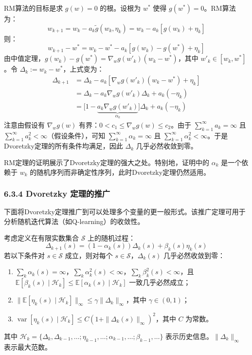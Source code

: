 \documentclass[UTF8]{article}
\begin{document}
\begin{proofbox}
    RM算法的目标是求 $g(w) = 0$ 的根。设根为 $w^*$ 使得 $g(w^*) = 0$。RM算法为：
    \[
    w_{k+1} = w_k - a_k \tilde{g}(w_k, \eta_k) = w_k - a_k[g(w_k) + \eta_k]
    \]
    则：
    \[
    w_{k+1} - w^* = w_k - w^* - a_k[g(w_k) - g(w^*) + \eta_k]
    \]
    由中值定理，$g(w_k) - g(w^*) = \nabla_w g(w'_k)(w_k - w^*)$，其中 $w'_k \in [w_k, w^*]$。令 $\Delta_k := w_k - w^*$，上式变为：
    \[
    \begin{aligned}
    \Delta_{k+1} &= \Delta_k - a_k[\nabla_w g(w'_k)(w_k - w^*) + \eta_k] \\
    &= \Delta_k - a_k \nabla_w g(w'_k)\Delta_k + a_k(-\eta_k) \\
    &= \big[1 - \underbrace{a_k \nabla_w g(w'_k)}_{\alpha_k}\big]\Delta_k + a_k(-\eta_k)
    \end{aligned}
    \]
    注意由假设有 $\nabla_w g(w)$ 有界：$0 < c_1 \leq \nabla_w g(w) \leq c_2$。由于 $\sum_{k=1}^{\infty} a_k = \infty$ 且 $\sum_{k=1}^{\infty} a_k^2 < \infty$（假设条件），可知 $\sum_{k=1}^{\infty} \alpha_k = \infty$ 且 $\sum_{k=1}^{\infty} \alpha_k^2 < \infty$。于是Dvoretzky定理的所有条件均满足，因此 $\Delta_k$ 几乎必然收敛到零。
\end{proofbox}

RM定理的证明展示了Dvoretzky定理的强大之处。特别地，证明中的 $\alpha_k$ 是一个依赖于 $w_k$ 的随机序列而非确定性序列，此时Dvoretzky定理仍然适用。

\subsubsection*{6.3.4 Dvoretzky 定理的推广}

下面将Dvoretzky定理推广到可以处理多个变量的更一般形式。该推广定理可用于分析随机迭代算法（如Q-learning）的收敛性。

\begin{theorembox}
    考虑定义在有限实数集合 $\mathcal{S}$ 上的随机过程：
    \[
    \Delta_{k+1}(s) = (1 - \alpha_k(s))\Delta_k(s) + \beta_k(s)\eta_k(s)
    \]
    若以下条件对 $s \in \mathcal{S}$ 成立，则对每个 $s \in \mathcal{S}$，$\Delta_k(s)$ 几乎必然收敛到零：
    \begin{enumerate}
        \item $\sum_k \alpha_k(s) = \infty$，$\sum_k \alpha_k^2(s) < \infty$，$\sum_k \beta_k^2(s) < \infty$，且 $\mathbb{E}[\beta_k(s) \mid \mathcal{H}_k] \leq \mathbb{E}[\alpha_k(s) \mid \mathcal{H}_k]$ 一致几乎必然成立；
        \item $\|\mathbb{E}[\eta_k(s) \mid \mathcal{H}_k]\|_\infty \leq \gamma \|\Delta_k\|_\infty$，其中 $\gamma \in (0, 1)$；
        \item $\operatorname{var}[\eta_k(s) \mid \mathcal{H}_k] \leq C(1 + \|\Delta_k(s)\|_\infty)^2$，其中 $C$ 为常数。
    \end{enumerate}
    其中 $\mathcal{H}_k = \{\Delta_k, \Delta_{k-1}, \dots; \eta_{k-1}, \dots; \alpha_{k-1}, \dots; \beta_{k-1}, \dots\}$ 表示历史信息。$\|\Delta_k\|_\infty$ 表示最大范数。
\end{theorembox}
\end{document}
